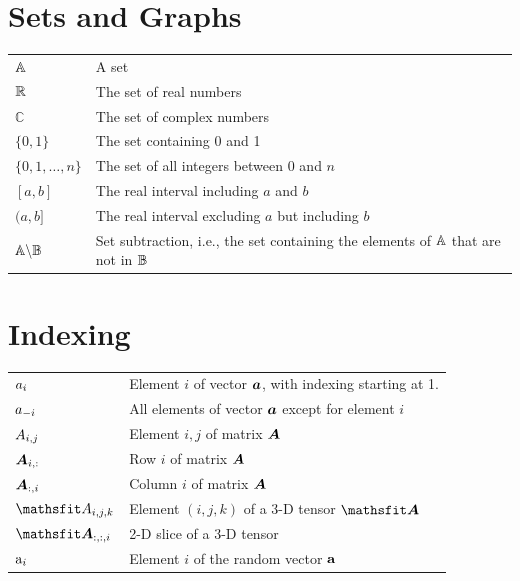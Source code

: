 \section*{Sets and Graphs}
\def\arraystretch{1.5}
\begin{longtable}{p{}p{}}
$\displaystyle {\mathbb{A}}$ & A set\\
$\displaystyle \mathbb{R}$ & The set of real numbers \\
$\displaystyle \mathbb{C}$ & The set of complex numbers \\
$\displaystyle \{0, 1\}$ & The set containing 0 and 1 \\
$\displaystyle \{0, 1, \dots, n \}$ & The set of all integers between $0$ and $n$\\
$\displaystyle [a, b]$ & The real interval including $a$ and $b$\\
$\displaystyle (a, b]$ & The real interval excluding $a$ but including $b$\\
$\displaystyle {\mathbb{A}} \backslash {\mathbb{B}}$ & Set subtraction, i.e., the set containing the elements of ${\mathbb{A}}$ that are not in ${\mathbb{B}}$\\
\end{longtable}
%
%
\section*{Indexing}
\def\arraystretch{1.5}
\begin{longtable}{p{}p{}}
$\displaystyle {a}_i$ & Element $i$ of vector ${\bm{a}}$, with indexing starting at 1.\\
$\displaystyle {a}_{-i}$ & All elements of vector ${\bm{a}}$ except for element $i$ \\
$\displaystyle {A}_{i,j}$ & Element $i, j$ of matrix ${\bm{A}}$ \\
$\displaystyle {\bm{A}}_{i, :}$ & Row $i$ of matrix ${\bm{A}}$ \\
$\displaystyle {\bm{A}}_{:, i}$ & Column $i$ of matrix ${\bm{A}}$ \\
$\displaystyle \etA_{i, j, k}$ & Element $(i, j, k)$ of a 3-D tensor $\tA$\\
$\displaystyle \tA_{:, :, i}$ & 2-D slice of a 3-D tensor\\
$\displaystyle {\textnormal{a}}_i$ & Element $i$ of the random vector ${\mathbf{a}}$ \\
\end{longtable}
%
%
